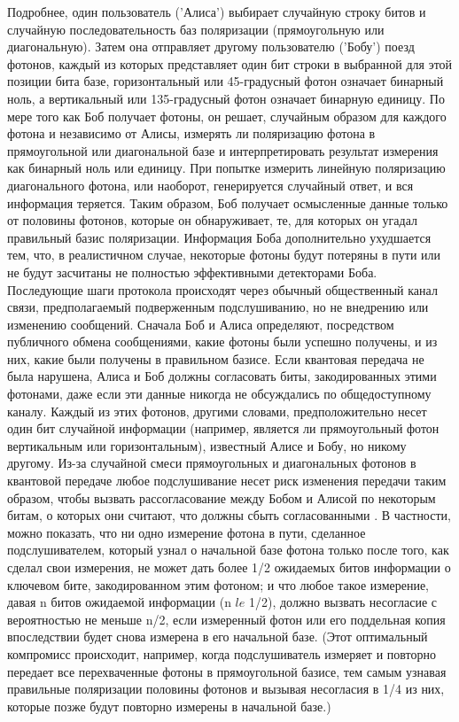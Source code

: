 Подробнее, один пользователь ('Алиса') выбирает случайную строку битов и случайную последовательность баз поляризации (прямоугольную или диагональную). Затем она отправляет другому пользователю ('Бобу') поезд фотонов, каждый из которых представляет один бит строки в выбранной для этой позиции бита базе, горизонтальный или 45-градусный фотон означает бинарный ноль, а вертикальный или 135-градусный фотон означает бинарную единицу. По мере того как Боб получает фотоны, он решает, случайным образом для каждого фотона и независимо от Алисы, измерять ли поляризацию фотона в прямоугольной или диагональной базе и интерпретировать результат измерения как бинарный ноль или единицу.  При попытке измерить линейную поляризацию диагонального фотона, или наоборот, генерируется случайный ответ, и вся информация теряется. Таким образом, Боб получает осмысленные данные только от половины фотонов, которые он обнаруживает, те, для которых он угадал правильный базис поляризации. Информация Боба дополнительно ухудшается тем, что, в реалистичном случае, некоторые фотоны будут потеряны в пути или не будут засчитаны не полностью эффективными детекторами Боба. Последующие шаги протокола происходят через обычный общественный канал связи, предполагаемый подверженным подслушиванию, но не внедрению или изменению сообщений. Сначала Боб и Алиса определяют, посредством публичного обмена сообщениями, какие фотоны были успешно получены, и из них, какие были получены в правильном базисе. Если квантовая передача не была нарушена, Алиса и Боб должны согласовать  биты, закодированных этими фотонами, даже если эти данные никогда не обсуждались по общедоступному каналу. Каждый из этих фотонов, другими словами, предположительно несет один бит случайной информации (например, является ли прямоугольный фотон вертикальным или горизонтальным), известный Алисе и Бобу, но никому другому.
Из-за случайной смеси прямоугольных и диагональных фотонов в квантовой передаче любое подслушивание несет риск изменения передачи таким образом, чтобы вызвать рассогласование между Бобом и Алисой по некоторым битам, о которых они считают, что должны сбыть согласованными . В частности, можно показать, что ни одно измерение фотона в пути, сделанное подслушивателем, который узнал о начальной базе фотона только после того, как сделал свои измерения, не может дать более 1/2 ожидаемых битов информации о ключевом бите, закодированном этим фотоном; и что любое такое измерение, давая n битов ожидаемой информации (n $le$ 1/2), должно вызвать несогласие с вероятностью не меньше n/2, если измеренный фотон или его поддельная копия впоследствии будет снова измерена в его начальной базе. (Этот оптимальный компромисс происходит, например, когда подслушиватель измеряет и повторно передает все перехваченные фотоны в прямоугольной базисе, тем самым узнавая правильные поляризации половины фотонов и вызывая несогласия в 1/4 из них, которые позже будут повторно измерены в начальной базе.)

